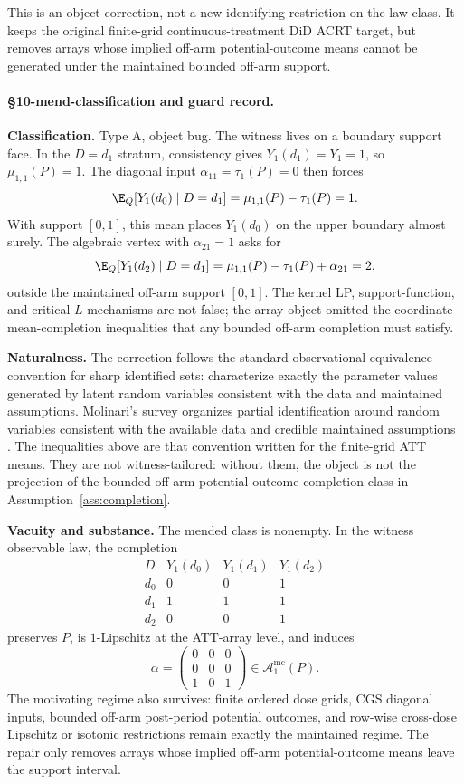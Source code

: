 This is an object correction, not a new identifying restriction on the law
class.  It keeps the original finite-grid continuous-treatment DiD ACRT target,
but removes arrays whose implied off-arm potential-outcome means cannot be
generated under the maintained bounded off-arm support.

\paragraph{\S10-mend-classification and guard record.}
\textbf{Classification.} Type A, object bug.  The witness lives on a boundary
support face.  In the \(D=d_1\) stratum, consistency gives
\(Y_1(d_1)=Y_1=1\), so
\(\mu_{1,1}(P)=1\).  The diagonal input \(\alpha_{11}=\tau_1(P)=0\) then
forces
\[
  \E_Q[Y_1(d_0)\mid D=d_1]
  =
  \mu_{1,1}(P)-\tau_1(P)
  =
  1.
\]
With support \([0,1]\), this mean places \(Y_1(d_0)\) on the upper boundary
almost surely.  The algebraic vertex with \(\alpha_{21}=1\) asks for
\[
  \E_Q[Y_1(d_2)\mid D=d_1]
  =
  \mu_{1,1}(P)-\tau_1(P)+\alpha_{21}
  =
  2,
\]
outside the maintained off-arm support \([0,1]\).  The kernel LP,
support-function, and critical-\(L\) mechanisms are not false; the array object
omitted the coordinate mean-completion inequalities that any bounded off-arm
completion must satisfy.

\textbf{Naturalness.} The correction follows the standard
observational-equivalence convention for sharp identified sets: characterize
exactly the parameter values generated by latent random variables consistent
with the data and maintained assumptions.  Molinari's survey organizes partial
identification around random variables consistent with the available data and
credible maintained assumptions \cite{Molinari2020}.  The inequalities above
are that convention written for the finite-grid ATT means.  They are not
witness-tailored: without them, the object is not the projection of the
bounded off-arm potential-outcome completion class in
Assumption~\ref{ass:completion}.

\textbf{Vacuity and substance.} The mended class is nonempty.  In the witness
observable law, the completion
\[
\begin{array}{c|ccc}
  D & Y_1(d_0) & Y_1(d_1) & Y_1(d_2)\\ \hline
  d_0 & 0&0&1\\
  d_1 & 1&1&1\\
  d_2 & 0&0&1
\end{array}
\]
preserves \(P\), is \(1\)-Lipschitz at the ATT-array level, and induces
\[
  \alpha=
  \begin{pmatrix}
    0&0&0\\
    0&0&0\\
    1&0&1
  \end{pmatrix}
  \in\mathcal A_1^{\mathrm{mc}}(P).
\]
The motivating regime also survives: finite ordered dose grids, CGS diagonal
inputs, bounded off-arm post-period potential outcomes, and row-wise cross-dose
Lipschitz or isotonic restrictions remain exactly the maintained regime.  The
repair only removes arrays whose implied off-arm potential-outcome means leave
the support interval.

